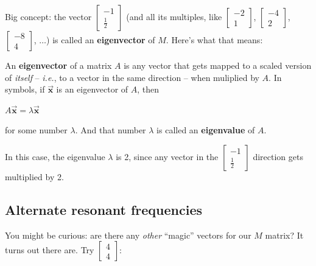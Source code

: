 \pagebreak
{}

Big concept: the vector {\footnotesize $\begin{bmatrix} -1 \\ \frac{1}{2}
\end{bmatrix}$} (and all its multiples, like {\footnotesize $\begin{bmatrix} -2
\\ 1 \end{bmatrix}$}, {\footnotesize $\begin{bmatrix} -4 \\ 2 \end{bmatrix}$},
{\footnotesize $\begin{bmatrix} -8 \\ 4 \end{bmatrix}$},
$\dots$) is called an \textbf{eigenvector} of $M$. Here's what that means:

\begin{framed}

An \textbf{eigenvector} of a matrix $A$ is any vector that gets mapped to a
scaled version of \textit{itself} -- \textit{i.e.}, to a vector in the same
direction -- when muliplied by $A$. In symbols, if
$\overrightarrow{\textbf{x}}$ is an eigenvector of $A$, then

{\centering
$ \displaystyle
A \overrightarrow{\textbf{x}} = \lambda \overrightarrow{\textbf{x}}$ \\
}

for some number $\lambda$. And that number $\lambda$ is called an
\textbf{eigenvalue} of $A$.
\end{framed}

In this case, the eigenvalue $\lambda$ is 2, since any vector in the
{\footnotesize $\begin{bmatrix} -1 \\ \frac{1}{2} \end{bmatrix}$} direction
gets multiplied by 2.

\subsection{Alternate resonant frequencies}

You might be curious: are there any \textit{other} ``magic'' vectors for our
$M$ matrix? It turns out there are. Try {\footnotesize $\begin{bmatrix} 4 \\ 4
\end{bmatrix}$}:

